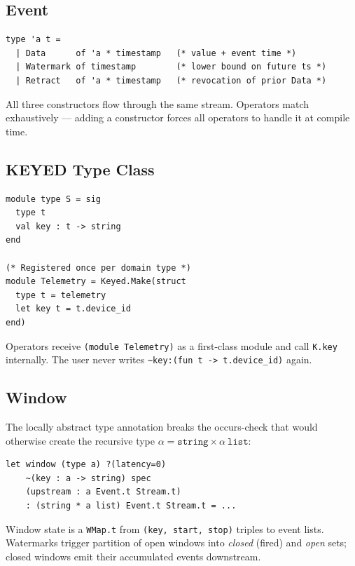 \documentclass[11pt,a4paper]{article}
\begin{document}
\subsection{Event}

\begin{lstlisting}
type 'a t =
  | Data      of 'a * timestamp   (* value + event time *)
  | Watermark of timestamp        (* lower bound on future ts *)
  | Retract   of 'a * timestamp   (* revocation of prior Data *)
\end{lstlisting}

All three constructors flow through the same stream. Operators
match exhaustively — adding a constructor forces all operators
to handle it at compile time.

\subsection{KEYED Type Class}

\begin{lstlisting}
module type S = sig
  type t
  val key : t -> string
end

(* Registered once per domain type *)
module Telemetry = Keyed.Make(struct
  type t = telemetry
  let key t = t.device_id
end)
\end{lstlisting}

Operators receive \texttt{(module Telemetry)} as a first-class module
and call \texttt{K.key} internally. The user never writes
\texttt{\textasciitilde{}key:(fun t -> t.device\_id)} again.

\subsection{Window}

The locally abstract type annotation breaks the occurs-check that
would otherwise create the recursive type
$\alpha = \mathtt{string} \times \alpha\ \mathtt{list}$:

\begin{lstlisting}
let window (type a) ?(latency=0)
    ~(key : a -> string) spec
    (upstream : a Event.t Stream.t)
    : (string * a list) Event.t Stream.t = ...
\end{lstlisting}

Window state is a \texttt{WMap.t} from \texttt{(key, start, stop)}
triples to event lists. Watermarks trigger partition of open windows
into \emph{closed} (fired) and \emph{open} sets; closed windows emit
their accumulated events downstream.
\end{document}
